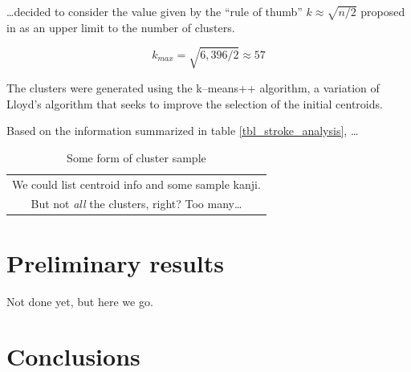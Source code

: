 \documentclass[10pt,conference,a4paper]{IEEEtran}
\begin{document}
	\ldots decided to consider the value given by the ``rule of thumb'' $k \approx \sqrt{n / 2}$ proposed in \cite{mardia2005multivariate}
	as an upper limit to the number of clusters.

	$$ k_{max} = \sqrt{6,396 / 2} \approx 57 $$

	The clusters were generated using the k--means++ algorithm,
	a variation of Lloyd's algorithm that seeks to improve the selection of the initial centroids. \cite{arthur2007k}

	Based on the information summarized in table \ref{tbl_stroke_analysis}, \ldots

	\begin{table}
		\renewcommand{\arraystretch}{1.3}
		\caption{Some form of cluster sample}
		\label{tbl_sample_clusters}
		\centering
		\begin{tabular}{c}
			We could list centroid info and some sample kanji. \\
			But not \emph{all} the clusters, right? Too many\ldots \\
		\end{tabular}
	\end{table}




	\section{Preliminary results}
	\label{sec:experiment_results}

	Not done yet, but here we go.


	\section{Conclusions}
	\label{sec:conclusions}
\end{document}
